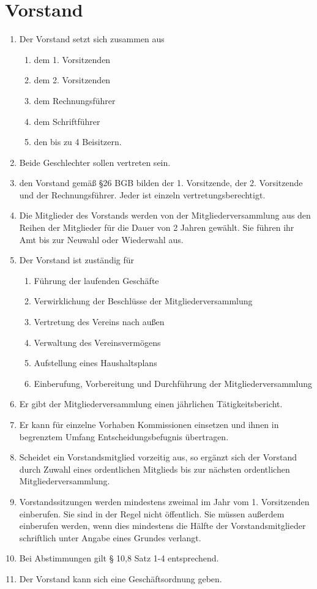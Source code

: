 \documentclass[11pt]{article}
\begin{document}
\section{Vorstand}
\begin{enumerate}[label=\arabic*)]
	\item Der Vorstand setzt sich zusammen aus
	\begin{enumerate}[label=\alph*)]
		\item dem 1. Vorsitzenden
		\item dem 2. Vorsitzenden
		\item dem Rechnungsführer
		\item dem Schriftführer
		\item den bis zu 4 Beisitzern.
	\end{enumerate}
	\item Beide Geschlechter sollen vertreten sein.
	\item den Vorstand gemäß §26 BGB bilden der 1. Vorsitzende, der 2. Vorsitzende und der Rechnungsführer. Jeder ist einzeln vertretungsberechtigt.
	\item Die Mitglieder des Vorstands werden von der Mitgliederversammlung aus den Reihen der Mitglieder für die Dauer von 2 Jahren gewählt. Sie führen ihr Amt bis zur Neuwahl oder Wiederwahl aus.
	\item Der Vorstand ist zuständig für
	\begin{enumerate}[label=\alph*)]
		\item Führung der laufenden Geschäfte
		\item Verwirklichung der Beschlüsse der Mitgliederversammlung
		\item Vertretung des Vereins nach außen
		\item Verwaltung des Vereinsvermögens
		\item Aufstellung eines Haushaltsplans
		\item Einberufung, Vorbereitung und Durchführung der Mitgliederversammlung
	\end{enumerate}	
	\item Er gibt der Mitgliederversammlung einen jährlichen Tätigkeitsbericht.
	\item Er kann für einzelne Vorhaben Kommissionen einsetzen und ihnen in begrenztem Umfang Entscheidungsbefugnis übertragen.
	\item Scheidet ein Vorstandsmitglied vorzeitig aus, so ergänzt sich der Vorstand durch Zuwahl eines ordentlichen Mitglieds bis zur nächsten ordentlichen Mitgliederversammlung. 
	\item Vorstandssitzungen werden mindestens zweimal im Jahr vom 1. Vorsitzenden einberufen. Sie sind in der Regel nicht öffentlich. Sie müssen außerdem einberufen werden, wenn dies mindestens die Hälfte der Vorstandsmitglieder schriftlich unter Angabe eines Grundes verlangt.
	\item Bei Abstimmungen gilt § 10,8 Satz 1-4 entsprechend.
	\item Der Vorstand kann sich eine Geschäftsordnung geben.
\end{enumerate}
\end{document}
